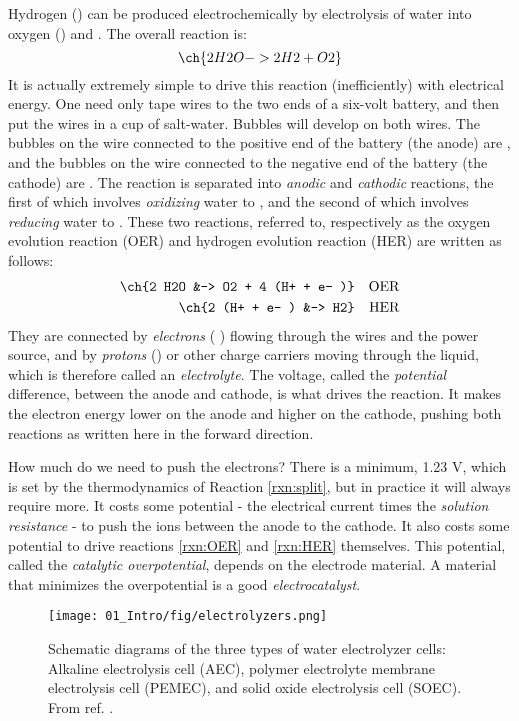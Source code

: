 Hydrogen () can be produced electrochemically by electrolysis of water into oxygen () and . The overall reaction is:
\begin{equation}
\ch{2 H2O -> 2 H2 + O2}\label{rxn:split}
\end{equation}
It is actually extremely simple to drive this reaction (inefficiently) with electrical energy. One need only tape wires to the two ends of a six-volt battery, and then put the wires in a cup of salt-water. Bubbles will develop on both wires. The bubbles on the wire connected to the positive end of the battery (the anode) are , and the bubbles on the wire connected to the negative end of the battery (the cathode) are . The reaction is separated into \textit{anodic} and \textit{cathodic} reactions, the first of which involves \textit{oxidizing} water to , and the second of which involves \textit{reducing} water to . These two reactions, referred to, respectively as the oxygen evolution reaction (OER) and hydrogen evolution reaction (HER) are written as follows:
\begin{align}
\ch{2 H2O &-> O2 + 4 (H+ + e- )} &&\text{OER}\label{rxn:OER}\\
\ch{2 (H+ + e- ) &-> H2} &&\text{HER}\label{rxn:HER}
\end{align}
They are connected by \textit{electrons} ( ) flowing through the wires and the power source, and by \textit{protons} () or other charge carriers moving through the liquid, which is therefore called an \textit{electrolyte}. The voltage, called the \textit{potential} difference, between the anode and cathode, is what drives the reaction. It makes the electron energy lower on the anode and higher on the cathode, pushing both reactions as written here in the forward direction. 

How much do we need to push the electrons? There is a minimum, 1.23 V, which is set by the thermodynamics of Reaction \ref{rxn:split}, but in practice it will always require more. It costs some potential - the electrical current times the \textit{solution resistance} - to push the ions between the anode to the cathode. It also costs some potential to drive reactions \ref{rxn:OER} and \ref{rxn:HER} themselves. This potential, called the \textit{catalytic overpotential}, depends on the electrode material. A material that minimizes the overpotential is a good \textit{electrocatalyst}.

\begin{figure}[h!]
	\centering
	\texttt{[image: 01\_Intro/fig/electrolyzers.png]}
	\caption{Schematic diagrams of the three types of water electrolyzer cells: Alkaline electrolysis cell (AEC), polymer electrolyte membrane electrolysis cell (PEMEC), and solid oxide electrolysis cell (SOEC). From ref. .}
	\label{fig:electrolyzers}
\end{figure}

